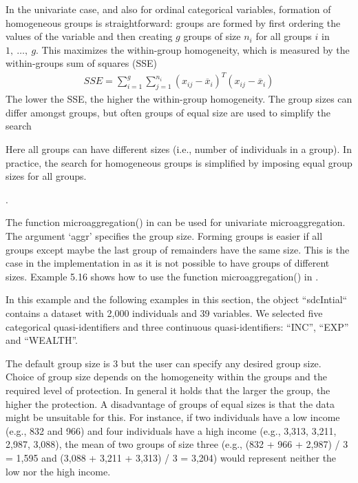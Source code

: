 \documentclass[letterpaper,10pt,english]{sphinxmanual}
\begin{document}
In the univariate case, and also for ordinal categorical variables,
formation of homogeneous groups is straightforward: groups are formed by
first ordering the values of the variable and then creating \(g\)
groups of size \(n_{i}\) for all groups \(i\) in
\(1,\ \ldots,\ g\). This maximizes the within-group homogeneity,
which is measured by the within-groups sum of squares (SSE)
\begin{equation*}
\begin{split}SSE = \sum_{i = 1}^{g}{\sum_{j = 1}^{n_{i}}{\left( x_{ij} - {\overline{x}}_{i} \right)^{T}\left( x_{ij} - {\overline{x}}_{i} \right)}}\end{split}
\end{equation*}
The lower the SSE, the higher the within-group homogeneity. The group
sizes can differ amongst groups, but often groups of equal size are used
to simplify the search %
\begin{footnote}[15]\sphinxAtStartFootnote
Here all groups can have different sizes (i.e., number of
individuals in a group). In practice, the search for homogeneous
groups is simplified by imposing equal group sizes for all groups.
%
\end{footnote}.

The function microaggregation() in  can be used for univariate
microaggregation. The argument ‘aggr’ specifies the group size. Forming
groups is easier if all groups \textendash{} except maybe the last group of
remainders \textendash{} have the same size. This is the case in the implementation
in  as it is not possible to have groups of different sizes.
Example 5.16 shows how to use the function microaggregation() in
. %
\begin{footnote}[16]\sphinxAtStartFootnote
In this example and the following examples in this section, the
 object “sdcIntial“ contains a dataset with 2,000
individuals and 39 variables. We selected five categorical
quasi-identifiers and three continuous quasi-identifiers: “INC”,
“EXP” and “WEALTH”.
%
\end{footnote} The default group size is 3 but the
user can specify any desired group size. Choice of group size depends on
the homogeneity within the groups and the required level of protection.
In general it holds that the larger the group, the higher the
protection. A disadvantage of groups of equal sizes is that the data
might be unsuitable for this. For instance, if two individuals have a
low income (e.g., 832 and 966) and four individuals have a high income
(e.g., 3,313, 3,211, 2,987, 3,088), the mean of two groups of size three
(e.g., (832 + 966 + 2,987) / 3 = 1,595 and (3,088 + 3,211 + 3,313) / 3 =
3,204) would represent neither the low nor the high income.
\end{document}
